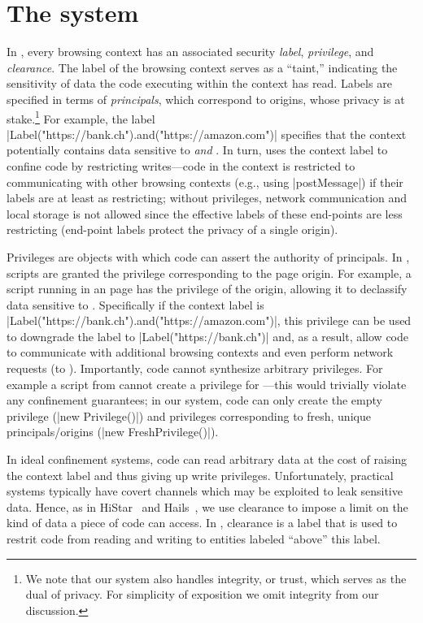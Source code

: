 \section{The \sys{} system}
\label{sec:system}

In \sys, every browsing context has an associated security \emph{label},
\emph{privilege}, and \emph{clearance}.
%
The label of the browsing context serves as a ``taint,'' indicating
the sensitivity of data the code executing within the context has
read.
%
Labels are specified in terms of \emph{principals}, which
correspond to origins, whose privacy is at stake.\footnote{
  We note that our system also handles integrity, or trust, which
  serves as the dual of privacy.
  For simplicity of exposition we omit integrity from our discussion.
}
%
For example, the label
\js|Label("https://bank.ch").and("https://amazon.com")| specifies that
the context potentially contains data sensitive to 
\emph{and} .
%
In turn, \sys{} uses the context label to confine code by restricting
writes---code in the context is restricted to communicating with other
browsing contexts (e.g., using \js|postMessage|) if their labels are at
least as restricting; without privileges, network communication and
local storage is not allowed since the effective labels of these
end-points are less restricting (end-point labels protect the privacy
of a single origin).

Privileges are objects with which code can assert the authority of
principals. 
%
In \sys, scripts are granted the privilege corresponding to the
page origin.
%
For example, a script running in an  page has the
privilege of the origin, allowing it to declassify data sensitive to
.
%
Specifically if the context label is
\js|Label("https://bank.ch").and("https://amazon.com")|, this privilege
can be used to downgrade the label to \js|Label("https://bank.ch")|
and, as a result, allow code to communicate with additional browsing
contexts and even perform network requests (to ).
%
Importantly, code cannot synthesize arbitrary privileges.
%
For example a  script from  cannot create a
privilege for ---this would trivially violate any
confinement guarantees;
%
in our system, code can only create the empty privilege
(\js|new Privilege()|) 
and privileges corresponding to fresh, unique principals/origins
(\js|new FreshPrivilege()|).

In ideal confinement systems, code can read arbitrary data at the cost
of raising the context label and thus giving up write privileges.
%
Unfortunately, practical systems typically have covert channels which
may be exploited to leak sensitive data.
%
Hence, as in HiStar~ and Hails~, we use
clearance to impose a limit on the kind of data a piece of code can
access.
%
In \sys, clearance is a label that is used to restrit code from
reading and writing to entities labeled ``above'' this label.

